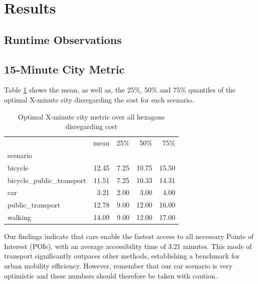 \clearpage
\section{Results}
\label{sec:results}


\subsection{Runtime Observations}
\label{subsec:runtime_observations}

\subsection{15-Minute City Metric}
\label{subsec:15_minute_city_metric}

Table \ref{tab:optimal_x_minute_city_metric} shows the mean, as well as, the 25\%, 50\% and 75\% quantiles of the optimal X-minute city disregarding the cost for each scenario.

\begin{table}
  \caption{Optimal X-minute city metric over all hexagons disregarding cost}
  \label{tab:optimal_x_minute_city_metric}
  \begin{center}
    \begin{tabular}{lrrrr}
       & mean & 25\% & 50\% & 75\% \\
      scenario &  &  &  &  \\
      bicycle & 12.45 & 7.25 & 10.75 & 15.50 \\
      bicycle_public_transport & 11.51 & 7.25 & 10.33 & 14.31 \\
      car & 3.21 & 2.00 & 3.00 & 4.00 \\
      public_transport & 12.78 & 9.00 & 12.00 & 16.00 \\
      walking & 14.09 & 9.00 & 12.00 & 17.00 \\
    \end{tabular}
  \end{center}
\end{table}

Our findings indicate that cars enable the fastest access to all necessary Points of Interest (POIs), with an average accessibility time of 3.21 minutes. 
This mode of transport significantly outpaces other methods, establishing a benchmark for urban mobility efficiency.
However, remember that our car scenario is very optimistic and these numbers should therefore be taken with caution.

